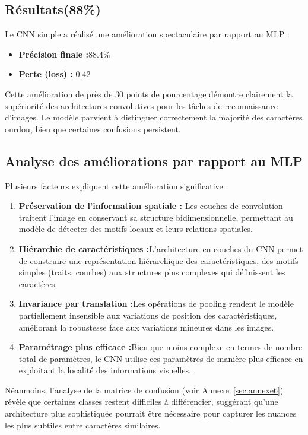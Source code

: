 \subsection{Résultats(88\%)}

\begin{flushleft}
Le CNN simple a réalisé une amélioration spectaculaire par rapport au MLP :

\begin{itemize}
\item \textbf{Précision finale :}88.4\%
\item \textbf{Perte (loss) : }0.42
\end{itemize}

\bigskip
Cette amélioration de près de 30 points de pourcentage démontre clairement la supériorité des architectures convolutives pour les tâches de reconnaissance d'images. Le modèle parvient à distinguer correctement la majorité des caractères ourdou, bien que certaines confusions persistent.
\end{flushleft}

\subsection{Analyse des améliorations par rapport au MLP}

\begin{flushleft}
Plusieurs facteurs expliquent cette amélioration significative :

\begin{enumerate}
\item \textbf{Préservation de l'information spatiale : }Les couches de convolution traitent l'image en conservant sa structure bidimensionnelle, permettant au modèle de détecter des motifs locaux et leurs relations spatiales.
\item \textbf{Hiérarchie de caractéristiques :}L'architecture en couches du CNN permet de construire une représentation hiérarchique des caractéristiques, des motifs simples (traits, courbes) aux structures plus complexes qui définissent les caractères.
\item \textbf{Invariance par translation :}Les opérations de pooling rendent le modèle partiellement insensible aux variations de position des caractéristiques, améliorant la robustesse face aux variations mineures dans les images.
\item \textbf{Paramétrage plus efficace :}Bien que moins complexe en termes de nombre total de paramètres, le CNN utilise ces paramètres de manière plus efficace en exploitant la localité des informations visuelles.
\end{enumerate}
\bigskip
Néanmoins, l'analyse de la matrice de confusion (voir Annexe~\ref{sec:annexe6}) révèle que certaines classes restent difficiles à différencier, suggérant qu'une architecture plus sophistiquée pourrait être nécessaire pour capturer les nuances les plus subtiles entre caractères similaires.
\end{flushleft}

